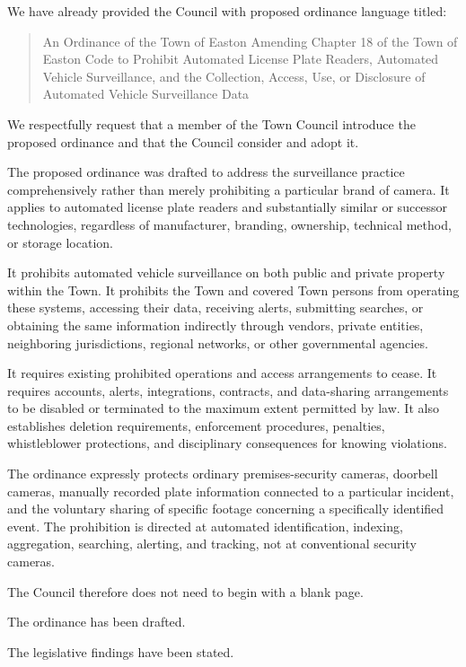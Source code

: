 \documentclass[11pt]{article}
\begin{document}
We have already provided the Council with proposed ordinance language titled:

\begin{quote}
An Ordinance of the Town of Easton Amending Chapter 18 of the Town of Easton Code to Prohibit Automated License Plate Readers, Automated Vehicle Surveillance, and the Collection, Access, Use, or Disclosure of Automated Vehicle Surveillance Data
\end{quote}

We respectfully request that a member of the Town Council introduce the proposed ordinance and that the Council consider and adopt it.

The proposed ordinance was drafted to address the surveillance practice comprehensively rather than merely prohibiting a particular brand of camera. It applies to automated license plate readers and substantially similar or successor technologies, regardless of manufacturer, branding, ownership, technical method, or storage location.

It prohibits automated vehicle surveillance on both public and private property within the Town. It prohibits the Town and covered Town persons from operating these systems, accessing their data, receiving alerts, submitting searches, or obtaining the same information indirectly through vendors, private entities, neighboring jurisdictions, regional networks, or other governmental agencies.

It requires existing prohibited operations and access arrangements to cease. It requires accounts, alerts, integrations, contracts, and data-sharing arrangements to be disabled or terminated to the maximum extent permitted by law. It also establishes deletion requirements, enforcement procedures, penalties, whistleblower protections, and disciplinary consequences for knowing violations.

The ordinance expressly protects ordinary premises-security cameras, doorbell cameras, manually recorded plate information connected to a particular incident, and the voluntary sharing of specific footage concerning a specifically identified event. The prohibition is directed at automated identification, indexing, aggregation, searching, alerting, and tracking, not at conventional security cameras.

The Council therefore does not need to begin with a blank page.

The ordinance has been drafted.

The legislative findings have been stated.
\end{document}
